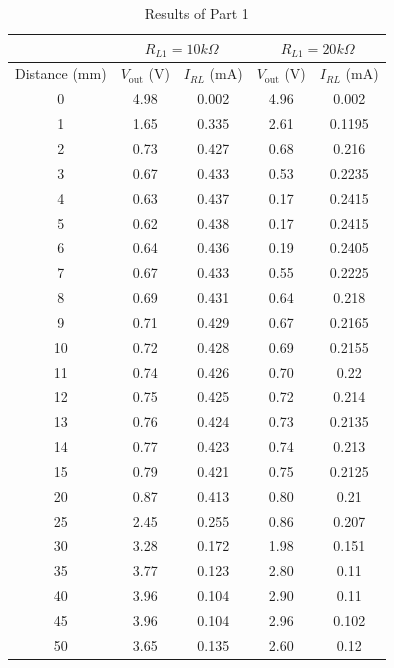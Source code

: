 \documentclass[CMPE]{KGCOEReport}
\begin{document}
\begin{table}[H]
    \centering
    \caption{Results of Part 1}
    \begin{tabular}{|c|c|c|c|c|}
        \hline
        & \multicolumn{2}{|c|}{$R_{L1} = 10k\Omega$} & \multicolumn{2}{|c|}{$R_{L1} = 20k\Omega$} \\
        \hline
        Distance (mm) & $V_{\text{out}}$ (V) & $I_{RL}$ (mA) & $V_{\text{out}}$ (V) & $I_{RL}$ (mA) \\
        \hline
        0 & 4.98 & 0.002 & 4.96 & 0.002 \\
        \hline
        1 & 1.65 & 0.335 & 2.61 & 0.1195 \\
        \hline
        2 & 0.73 & 0.427 & 0.68 & 0.216 \\
        \hline
        3 & 0.67 & 0.433 & 0.53 & 0.2235 \\
        \hline
        4 & 0.63 & 0.437 & 0.17 & 0.2415 \\
        \hline
        5 & 0.62 & 0.438 & 0.17 & 0.2415 \\
        \hline
        6 & 0.64 & 0.436 & 0.19 & 0.2405 \\
        \hline
        7 & 0.67 & 0.433 & 0.55 & 0.2225 \\
        \hline
        8 & 0.69 & 0.431 & 0.64 & 0.218 \\
        \hline
        9 & 0.71 & 0.429 & 0.67 & 0.2165 \\
        \hline
        10 & 0.72 & 0.428 & 0.69 & 0.2155 \\
        \hline
        11 & 0.74 & 0.426 & 0.70 & 0.22 \\
        \hline
        12 & 0.75 & 0.425 & 0.72 & 0.214 \\
        \hline
        13 & 0.76 & 0.424 & 0.73 & 0.2135 \\
        \hline
        14 & 0.77 & 0.423 & 0.74 & 0.213 \\
        \hline
        15 & 0.79 & 0.421 & 0.75 & 0.2125 \\
        \hline
        20 & 0.87 & 0.413 & 0.80 & 0.21 \\
        \hline
        25 & 2.45 & 0.255 & 0.86 & 0.207 \\
        \hline
        30 & 3.28 & 0.172 & 1.98 & 0.151 \\
        \hline
        35 & 3.77 & 0.123 & 2.80 & 0.11 \\
        \hline
        40 & 3.96 & 0.104 & 2.90 & 0.11 \\
        \hline
        45 & 3.96 & 0.104 & 2.96 & 0.102 \\
        \hline
        50 & 3.65 & 0.135 & 2.60 & 0.12 \\
        \hline
    \end{tabular}
    \label{table:data}
\end{table}
\end{document}
